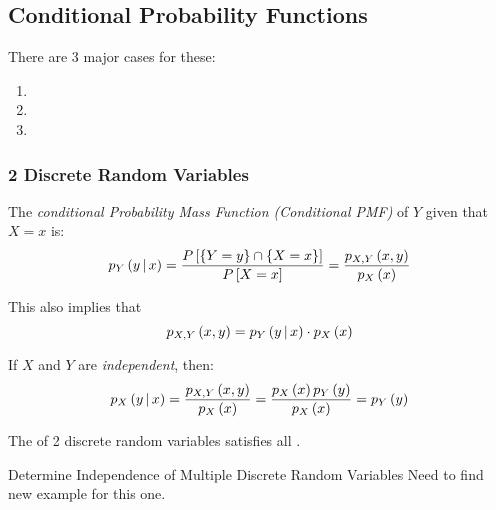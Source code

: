 		\subsection{Conditional Probability Functions} \label{subsec:Multiple Variable Conditional Probability Functions}
		There are 3 major cases for these:
			\begin{enumerate}
				\item {}
				\item {}
				\item {}
			\end{enumerate}
					
			\subsubsection{2 Discrete Random Variables} \label{subsubsec:2 Discrete Random Variables}
				\begin{definition} \label{def:2 Discrete-Conditional PMF}
					The \emph{conditional Probability Mass Function (Conditional PMF)} of $Y$ given that $X=x$ is:
					\begin{equation} \label{eq:2 Discrete-Conditional PMF}
						p_{Y} \left( y \operatorname{\vert} x \right)
							= \frac{P \left[ \lbrace Y=y \rbrace \cap \lbrace X=x \rbrace \right]}{P \left[ X=x \right]} 
							= \frac{p_{X,Y} \left( x,y \right)}{p_{X} \left( x \right)}
					\end{equation}
					\begin{remark}
						This also implies that
						\begin{equation} \label{eq:2 Discrete-Joint PMF}
							p_{X,Y} \left( x,y \right) = p_{Y} \left( y \operatorname{\vert} x \right) \cdot p_{X} \left( x \right)
						\end{equation}
					\end{remark}
					\begin{remark}
						If $X$ and $Y$ are \emph{independent}, then:
						\begin{equation} \label{eq:2 Discrete-Independent Conditional PMF}
							p_{X} \left( y \operatorname{\vert} x \right)
							= \frac{p_{X,Y} \left( x,y \right)}{p_{X} \left( x \right)}
							= \frac{p_{X} \left( x \right) p_{Y} \left( y \right)}{p_{X} \left( x \right)}
							= p_{Y} \left( y \right)
						\end{equation}
					\end{remark}
					\begin{remark}
						The  of 2 discrete random variables satisfies all .
					\end{remark}
				\end{definition}
				\begin{example}[Problem 5.75]{Determine Independence of Multiple Discrete Random Variables}
                                  Need to find new example for this one.
				\end{example}

